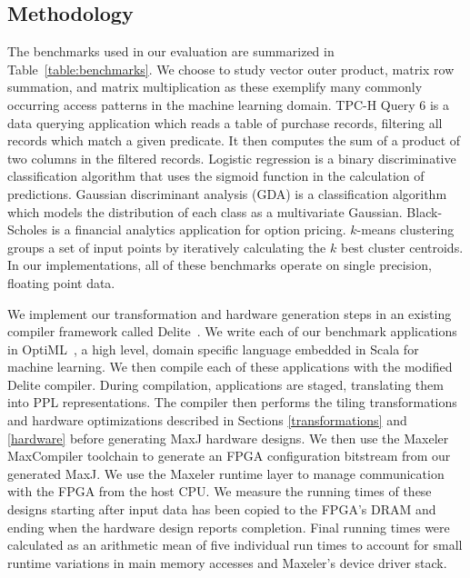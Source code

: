 \subsection{Methodology}
The benchmarks used in our evaluation are summarized in Table~\ref{table:benchmarks}.
We choose to study vector outer product, matrix row summation, and matrix multiplication as these exemplify many commonly occurring access patterns in the machine learning domain.
TPC-H Query 6 is a data querying application which reads a table of purchase records, filtering all
records which match a given predicate. It then computes the sum of a product of two columns in the filtered records.
Logistic regression is a binary discriminative classification algorithm that uses the sigmoid function in the calculation of predictions.
Gaussian discriminant analysis (GDA) is a classification algorithm which models the distribution of each class as a multivariate Gaussian.
Black-Scholes is a financial analytics application for option pricing.
$k$-means clustering groups a set of input points by iteratively calculating the $k$ best cluster centroids.
In our implementations, all of these benchmarks operate on single precision, floating point data.

We implement our transformation and hardware generation steps in an existing compiler framework called Delite~\cite{delite-tecs14}.
We write each of our benchmark applications in OptiML~\cite{optiml}, a high level, domain specific language embedded in Scala for machine learning.
We then compile each of these applications with the modified Delite compiler.
During compilation, applications are staged, translating them into PPL representations.
The compiler then performs the tiling transformations and hardware optimizations described in Sections \ref{transformations} and \ref{hardware} before generating MaxJ hardware designs.
We then use the Maxeler MaxCompiler toolchain to generate an FPGA configuration bitstream from our generated MaxJ. We use the Maxeler runtime layer to manage communication with the FPGA from the host CPU.
We measure the running times of these designs starting after input data has been copied to the FPGA's DRAM and ending when the hardware design reports completion.
Final running times were calculated as an arithmetic mean of five individual run times to account for small runtime variations in main memory accesses and Maxeler's device driver stack.

